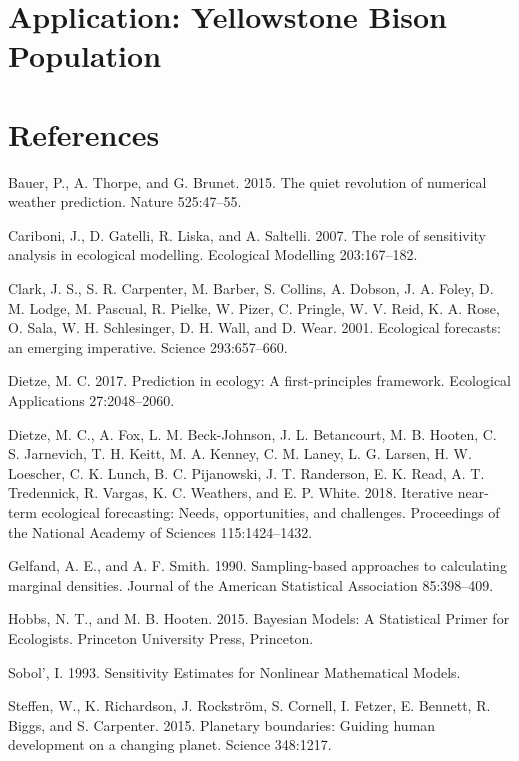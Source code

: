 \documentclass[12pt,]{article}
\begin{document}
\hypertarget{application-yellowstone-bison-population}{%
\section{Application: Yellowstone Bison
Population}\label{application-yellowstone-bison-population}}

\hypertarget{references}{%
\section*{References}\label{references}}

\hypertarget{refs}{}
\leavevmode\hypertarget{ref-Bauer2015}{}%
Bauer, P., A. Thorpe, and G. Brunet. 2015. The quiet revolution of
numerical weather prediction. Nature 525:47--55.

\leavevmode\hypertarget{ref-Cariboni2007}{}%
Cariboni, J., D. Gatelli, R. Liska, and A. Saltelli. 2007. The role of
sensitivity analysis in ecological modelling. Ecological Modelling
203:167--182.

\leavevmode\hypertarget{ref-Clark2001}{}%
Clark, J. S., S. R. Carpenter, M. Barber, S. Collins, A. Dobson, J. A.
Foley, D. M. Lodge, M. Pascual, R. Pielke, W. Pizer, C. Pringle, W. V.
Reid, K. A. Rose, O. Sala, W. H. Schlesinger, D. H. Wall, and D. Wear.
2001. Ecological forecasts: an emerging imperative. Science
293:657--660.

\leavevmode\hypertarget{ref-Dietze2017a}{}%
Dietze, M. C. 2017. Prediction in ecology: A first-principles framework.
Ecological Applications 27:2048--2060.

\leavevmode\hypertarget{ref-Dietze2018}{}%
Dietze, M. C., A. Fox, L. M. Beck-Johnson, J. L. Betancourt, M. B.
Hooten, C. S. Jarnevich, T. H. Keitt, M. A. Kenney, C. M. Laney, L. G.
Larsen, H. W. Loescher, C. K. Lunch, B. C. Pijanowski, J. T. Randerson,
E. K. Read, A. T. Tredennick, R. Vargas, K. C. Weathers, and E. P.
White. 2018. Iterative near-term ecological forecasting: Needs,
opportunities, and challenges. Proceedings of the National Academy of
Sciences 115:1424--1432.

\leavevmode\hypertarget{ref-Gelfand1990}{}%
Gelfand, A. E., and A. F. Smith. 1990. Sampling-based approaches to
calculating marginal densities. Journal of the American Statistical
Association 85:398--409.

\leavevmode\hypertarget{ref-Hobbs2015}{}%
Hobbs, N. T., and M. B. Hooten. 2015. Bayesian Models: A Statistical
Primer for Ecologists. Princeton University Press, Princeton.

\leavevmode\hypertarget{ref-Sobol1993}{}%
Sobol', I. 1993. Sensitivity Estimates for Nonlinear Mathematical
Models.

\leavevmode\hypertarget{ref-Steffen2015}{}%
Steffen, W., K. Richardson, J. Rockström, S. Cornell, I. Fetzer, E.
Bennett, R. Biggs, and S. Carpenter. 2015. Planetary boundaries: Guiding
human development on a changing planet. Science 348:1217.
\end{document}
